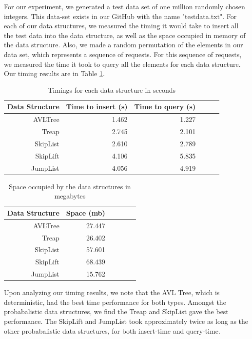 \documentclass[oribibl]{llncs}
\begin{document}
For our experiment, we generated a test data set of one million randomly chosen integers. This data-set exists in our GitHub with the name "testdata.txt". For each of our data structures, we measured the timing it would take to insert all the test data into the data structure, as well as the space occupied in memory of the data structure. Also, we made a random permutation of the elements in our data set, which represents a sequence of requests. For this sequence of requests, we measured the time it took to query all the elements for each data structure. Our timing results are in Table \ref{table:timings}.

\begin{table}[htbp]
\caption{Timings for each data structure in seconds}
\begin{center}
\begin{tabular}{|r|r|r|r|r|r|}
\hline
Data Structure & Time to insert (s) & Time to query (s) \\ \hline
AVLTree & 1.462 & 1.227 \\ \hline
Treap &  2.745 & 2.101 \\ \hline
SkipList & 2.610 & 2.789 \\ \hline
SkipLift & 4.106 & 5.835  \\ \hline
JumpList & 4.056 & 4.919 \\ \hline
\end{tabular}
\end{center}
\label{table:timings}
\end{table}

\begin{table}[htbp]
\caption{Space occupied by the data structures in megabytes}
\begin{center}
\begin{tabular}{|r|r|r|r|r|r|}
\hline
Data Structure & Space (mb) \\ \hline
AVLTree & 27.447 \\ \hline
Treap & 26.402 \\ \hline
SkipList & 57.601  \\ \hline
SkipLift & 68.439 \\ \hline
JumpList & 15.762 \\ \hline
\end{tabular}
\end{center}
\label{table:space}
\end{table}

Upon analyzing our timing results, we note that the AVL Tree, which is deterministic, had the best time performance for both types. Amongst the probabalistic data structures, we find the Treap and SkipList gave the best performance. The SkipLift and JumpList took approximately twice as long as the other probabalistic data structures, for both insert-time and query-time.
\end{document}
